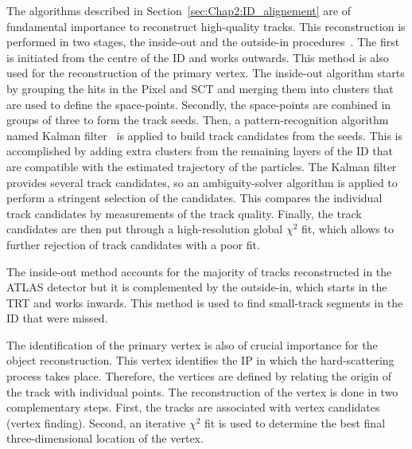 The algorithms described in Section~\ref{sec:Chap2:ID_alignement}
are of fundamental importance to reconstruct high-quality tracks. 
This reconstruction is performed in two stages, the inside-out and the outside-in 
procedures~\cite{ATLAS:2017kyn}. 
The first is initiated from the centre of the ID and works outwards. 
This method is also used for the reconstruction of the primary vertex.
The inside-out algorithm starts by grouping the hits in the Pixel and SCT 
and merging them into clusters that are used to define the space-points. 
Secondly, the space-points are
combined in groups of three to form the track seeds. Then, a pattern-recognition
algorithm named Kalman filter~\cite{Fruhwirth:1987fm} is applied to build track
candidates from the seeds. This is accomplished by adding extra clusters from 
the remaining layers of the ID that are compatible with the estimated trajectory of the particles.
The Kalman filter provides several track candidates, so an ambiguity-solver algorithm
is applied to perform a stringent selection of the candidates. This compares the
individual track candidates by measurements of the track quality.
Finally,  the track candidates are then put through a high-resolution global $\chi^2$ fit,
which allows to further rejection of track candidates with a poor fit.

The inside-out method accounts for the majority of tracks reconstructed in the ATLAS detector but it 
is complemented by the outside-in, which 
starts in the TRT and works inwards. This method is used to find small-track segments
in the ID that were missed. 

The identification of the primary vertex is also of crucial importance
for the object reconstruction. This vertex identifies the IP
in which the hard-scattering process takes place. Therefore, the vertices are
defined by relating the origin of the track with individual points. The reconstruction
of the vertex is done in two complementary steps. First, the tracks are associated with
vertex candidates (vertex finding). Second, an iterative $\chi^2$ fit is used to determine the
best final three-dimensional location of the vertex. 

 



